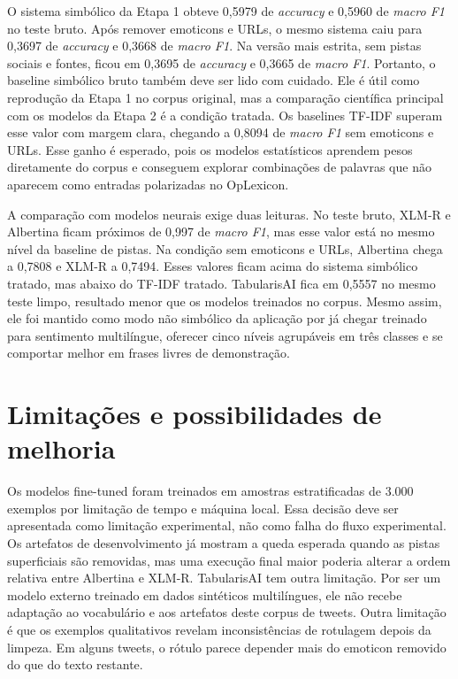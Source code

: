 \documentclass[11pt,a4paper]{article}
\begin{document}
O sistema simbólico da Etapa 1 obteve 0,5979 de \emph{accuracy} e 0,5960 de \emph{macro F1} no teste bruto. Após remover emoticons e URLs, o mesmo sistema caiu para 0,3697 de \emph{accuracy} e 0,3668 de \emph{macro F1}. Na versão mais estrita, sem pistas sociais e fontes, ficou em 0,3695 de \emph{accuracy} e 0,3665 de \emph{macro F1}. Portanto, o baseline simbólico bruto também deve ser lido com cuidado. Ele é útil como reprodução da Etapa 1 no corpus original, mas a comparação científica principal com os modelos da Etapa 2 é a condição tratada. Os baselines TF-IDF superam esse valor com margem clara, chegando a 0,8094 de \emph{macro F1} sem emoticons e URLs. Esse ganho é esperado, pois os modelos estatísticos aprendem pesos diretamente do corpus e conseguem explorar combinações de palavras que não aparecem como entradas polarizadas no OpLexicon.

A comparação com modelos neurais exige duas leituras. No teste bruto, XLM-R e Albertina ficam próximos de 0,997 de \emph{macro F1}, mas esse valor está no mesmo nível da baseline de pistas. Na condição sem emoticons e URLs, Albertina chega a 0,7808 e XLM-R a 0,7494. Esses valores ficam acima do sistema simbólico tratado, mas abaixo do TF-IDF tratado. TabularisAI fica em 0,5557 no mesmo teste limpo, resultado menor que os modelos treinados no corpus. Mesmo assim, ele foi mantido como modo não simbólico da aplicação por já chegar treinado para sentimento multilíngue, oferecer cinco níveis agrupáveis em três classes e se comportar melhor em frases livres de demonstração.

\section{Limitações e possibilidades de melhoria}

Os modelos fine-tuned foram treinados em amostras estratificadas de 3.000 exemplos por limitação de tempo e máquina local. Essa decisão deve ser apresentada como limitação experimental, não como falha do fluxo experimental. Os artefatos de desenvolvimento já mostram a queda esperada quando as pistas superficiais são removidas, mas uma execução final maior poderia alterar a ordem relativa entre Albertina e XLM-R. TabularisAI tem outra limitação. Por ser um modelo externo treinado em dados sintéticos multilíngues, ele não recebe adaptação ao vocabulário e aos artefatos deste corpus de tweets. Outra limitação é que os exemplos qualitativos revelam inconsistências de rotulagem depois da limpeza. Em alguns tweets, o rótulo parece depender mais do emoticon removido do que do texto restante.
\end{document}
